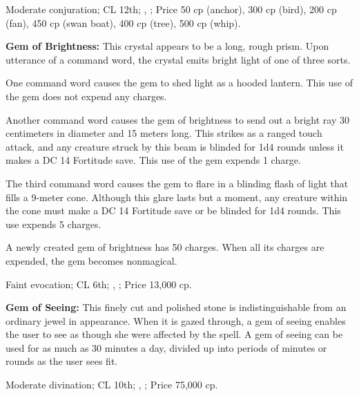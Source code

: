 Moderate conjuration; CL 12th; , ; Price 50 cp (anchor), 300 cp (bird), 200 cp (fan), 450 cp (swan boat), 400 cp (tree), 500 cp (whip).



\textbf{Gem of Brightness:} This crystal appears to be a long, rough prism. Upon utterance of a command word, the crystal emits bright light of one of three sorts.

\begin{itemize*}
\item One command word causes the gem to shed light as a hooded lantern. This use of the gem does not expend any charges.
\item Another command word causes the gem of brightness to send out a bright ray 30 centimeters in diameter and 15 meters long. This strikes as a ranged touch attack, and any creature struck by this beam is blinded for 1d4 rounds unless it makes a DC 14 Fortitude save. This use of the gem expends 1 charge.
\item The third command word causes the gem to flare in a blinding flash of light that fills a 9-meter cone. Although this glare lasts but a moment, any creature within the cone must make a DC 14 Fortitude save or be blinded for 1d4 rounds. This use expends 5 charges.
\end{itemize*}

A newly created gem of brightness has 50 charges. When all its charges are expended, the gem becomes nonmagical.

Faint evocation; CL 6th; , ; Price 13,000 cp.



\textbf{Gem of Seeing:} This finely cut and polished stone is indistinguishable from an ordinary jewel in appearance. When it is gazed through, a gem of seeing enables the user to see as though she were affected by the  spell. A gem of seeing can be used for as much as 30 minutes a day, divided up into periods of minutes or rounds as the user sees fit.

Moderate divination; CL 10th; , ; Price 75,000 cp.




